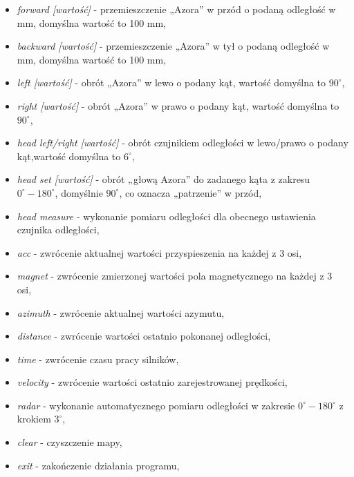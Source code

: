         \begin{itemize}
            \item \textit{forward [wartość]}            - przemieszczenie „Azora” w przód o podaną odległość w mm, domyślna wartość to 100 mm,
            \item \textit{backward [wartość]}           - przemieszczenie „Azora” w tył o podaną odległość w mm, domyślna wartość to 100 mm,
            \item \textit{left [wartość]}               - obrót „Azora” w lewo o podany kąt, wartość domyślna to $90^\circ$,
            \item \textit{right [wartość]}              - obrót „Azora” w prawo o podany kąt, wartość domyślna to $90^\circ$,
            \item \textit{head left/right [wartość]}    - obrót czujnikiem odległości w lewo/prawo o podany kąt,wartość domyślna to $6^\circ$,
            \item \textit{head set [wartość]}           - obrót „głową Azora” do zadanego kąta z zakresu $0^\circ-180^\circ$, domyślnie $90^\circ$, co oznacza „patrzenie” w przód,
            \item \textit{head measure}                 - wykonanie pomiaru odległości dla obecnego ustawienia czujnika odległości,
            \item \textit{acc}                          - zwrócenie aktualnej wartości przyspieszenia na każdej z 3 osi,
            \item \textit{magnet}                       - zwrócenie zmierzonej wartości pola magnetycznego na każdej z 3 osi,
            \item \textit{azimuth}                      - zwrócenie aktualnej wartości azymutu,
            \item \textit{distance}                     - zwrócenie wartości ostatnio pokonanej odległości,
            \item \textit{time}                         - zwrócenie czasu pracy silników,
            \item \textit{velocity}                     - zwrócenie wartości ostatnio zarejestrowanej prędkości,
            \item \textit{radar}                        - wykonanie automatycznego pomiaru odległości w zakresie $0^\circ-180^\circ$ z krokiem $3^\circ$,
            \item \textit{clear}                        - czyszczenie mapy,
            \item \textit{exit}                         - zakończenie działania programu,
        \end{itemize}
    